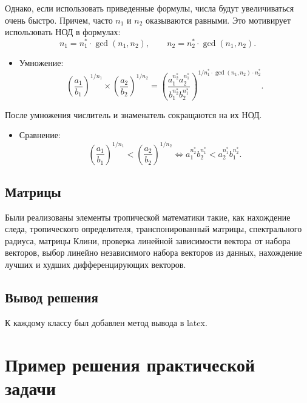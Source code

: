 \documentclass{spisok-article}
\begin{document}
    Однако, если использовать приведенные формулы, числа будут увеличиваться очень быстро.
    Причем, часто $n_1$ и $n_2$ оказываются равными. Это мотивирует использовать НОД в формулах:
    $$n_1 =  n^*_1 \cdot \gcd(n_1, n_2), \qquad n_2 =  n^*_2 \cdot \gcd(n_1, n_2).$$

    \begin{itemize}
        \item Умножение:
        $$ \left(\frac{a_1}{b_1}\right)^{1/n_1} \times \left(\frac{a_2}{b_2}\right)^{1/n_2} = \left(\frac{a_1^{n^*_2}a_2^{n^*_1}}{b_1^{n^*_2}b_2^{n^*_1}}\right)^{1/n^*_1\cdot \gcd(n_1, n_2) \cdot n^*_2}.$$
    \end{itemize}
		После умножения числитель и знаменатель сокращаются на их НОД.
\begin{itemize}				
        \item Сравнение:
        $$ \left(\frac{a_1}{b_1}\right)^{1/n_1} < \left(\frac{a_2}{b_2}\right)^{1/n_2} \Leftrightarrow
        {a_1^{n^*_2}}{b_2^{n^*_1}} < {a_2^{n^*_1}}{b_1^{n^*_2}}.$$
    \end{itemize}



    \subsection{Матрицы}
    Были реализованы элементы тропической математики такие, как нахождение следа, тропического определителя, транспонированный матрицы, спектрального радиуса, матрицы Клини, проверка линейной зависимости вектора от набора векторов, выбор линейно независимого набора векторов из данных, нахождение лучших и худших дифференцирующих векторов.


    \subsection{Вывод решения}
    К каждому классу был добавлен метод вывода в latex.
    
    \section{Пример решения практической задачи}
\end{document}
